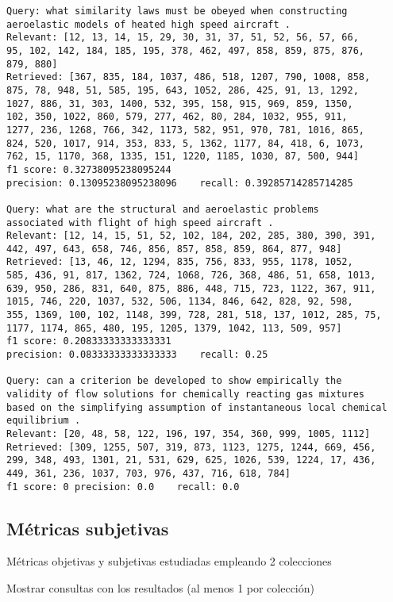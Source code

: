 \documentclass[12pt]{llncs}
\begin{document}
\begin{verbatim}
Query: what similarity laws must be obeyed when constructing
aeroelastic models of heated high speed aircraft .
Relevant: [12, 13, 14, 15, 29, 30, 31, 37, 51, 52, 56, 57, 66,
95, 102, 142, 184, 185, 195, 378, 462, 497, 858, 859, 875, 876,
879, 880]
Retrieved: [367, 835, 184, 1037, 486, 518, 1207, 790, 1008, 858,
875, 78, 948, 51, 585, 195, 643, 1052, 286, 425, 91, 13, 1292,
1027, 886, 31, 303, 1400, 532, 395, 158, 915, 969, 859, 1350,
102, 350, 1022, 860, 579, 277, 462, 80, 284, 1032, 955, 911,
1277, 236, 1268, 766, 342, 1173, 582, 951, 970, 781, 1016, 865,
824, 520, 1017, 914, 353, 833, 5, 1362, 1177, 84, 418, 6, 1073,
762, 15, 1170, 368, 1335, 151, 1220, 1185, 1030, 87, 500, 944]
f1 score: 0.32738095238095244
precision: 0.13095238095238096    recall: 0.39285714285714285

Query: what are the structural and aeroelastic problems
associated with flight of high speed aircraft .
Relevant: [12, 14, 15, 51, 52, 102, 184, 202, 285, 380, 390, 391,
442, 497, 643, 658, 746, 856, 857, 858, 859, 864, 877, 948]
Retrieved: [13, 46, 12, 1294, 835, 756, 833, 955, 1178, 1052,
585, 436, 91, 817, 1362, 724, 1068, 726, 368, 486, 51, 658, 1013,
639, 950, 286, 831, 640, 875, 886, 448, 715, 723, 1122, 367, 911,
1015, 746, 220, 1037, 532, 506, 1134, 846, 642, 828, 92, 598,
355, 1369, 100, 102, 1148, 399, 728, 281, 518, 137, 1012, 285, 75,
1177, 1174, 865, 480, 195, 1205, 1379, 1042, 113, 509, 957]
f1 score: 0.20833333333333331
precision: 0.08333333333333333    recall: 0.25

Query: can a criterion be developed to show empirically the
validity of flow solutions for chemically reacting gas mixtures
based on the simplifying assumption of instantaneous local chemical equilibrium .
Relevant: [20, 48, 58, 122, 196, 197, 354, 360, 999, 1005, 1112]
Retrieved: [309, 1255, 507, 319, 873, 1123, 1275, 1244, 669, 456,
299, 348, 493, 1301, 21, 531, 629, 625, 1026, 539, 1224, 17, 436,
449, 361, 236, 1037, 703, 976, 437, 716, 618, 784]
f1 score: 0 precision: 0.0    recall: 0.0
\end{verbatim}


\subsection{Métricas subjetivas}

Métricas objetivas y subjetivas estudiadas empleando 2 colecciones

Mostrar consultas con los resultados (al menos 1 por colección)
\end{document}
